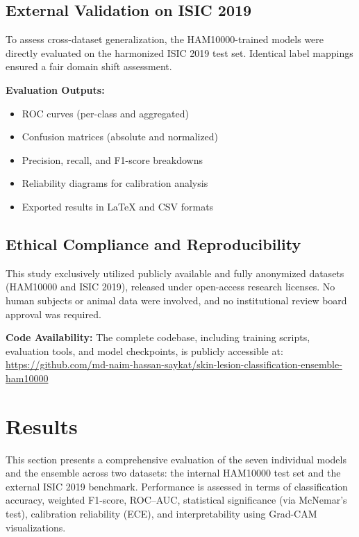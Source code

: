 \documentclass[pdflatex,sn-mathphys-num]{sn-jnl}%
\theoremstyle{thmstyleone}%
\theoremstyle{thmstyletwo}%
\theoremstyle{thmstylethree}%
\begin{document}
\subsection{External Validation on ISIC 2019}

To assess cross-dataset generalization, the HAM10000-trained models were directly evaluated on the harmonized ISIC 2019 test set.  
Identical label mappings ensured a fair domain shift assessment.

\vspace{0.5em}
\noindent\textbf{Evaluation Outputs:}
\begin{itemize}
    \item ROC curves (per-class and aggregated)
    \item Confusion matrices (absolute and normalized)
    \item Precision, recall, and F1-score breakdowns
    \item Reliability diagrams for calibration analysis
    \item Exported results in LaTeX and CSV formats
\end{itemize}

\subsection{Ethical Compliance and Reproducibility}

This study exclusively utilized publicly available and fully anonymized datasets (HAM10000 and ISIC 2019), released under open-access research licenses.  
No human subjects or animal data were involved, and no institutional review board approval was required.

\vspace{0.5em}
\noindent\textbf{Code Availability:}  
The complete codebase, including training scripts, evaluation tools, and model checkpoints, is publicly accessible at:  
\url{https://github.com/md-naim-hassan-saykat/skin-lesion-classification-ensemble-ham10000}

\section{Results}\label{sec4}

This section presents a comprehensive evaluation of the seven individual models and the ensemble across two datasets: the internal HAM10000 test set and the external ISIC 2019 benchmark. Performance is assessed in terms of classification accuracy, weighted F1-score, ROC–AUC, statistical significance (via McNemar's test), calibration reliability (ECE), and interpretability using Grad-CAM visualizations.
\end{document}
